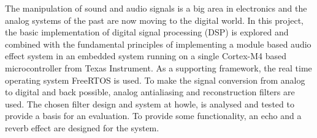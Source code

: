 The manipulation of sound and audio signals is a big area in electronics and the analog systems of the past are now moving to the digital world. In this project, the basic implementation of digital signal processing (DSP) is explored and combined with the fundamental principles of implementing a module based audio effect system in an embedded system running on a single Cortex-M4 based microcontroller from Texas Instrument. As a supporting framework, the real time operating system FreeRTOS is used. To make the signal conversion from analog to digital and back possible, analog antialiasing and reconstruction filters are used. The chosen filter design and system at howle, is analysed and tested to provide a basis for an evaluation. To provide some functionality, an echo and a reverb effect are designed for the system.      